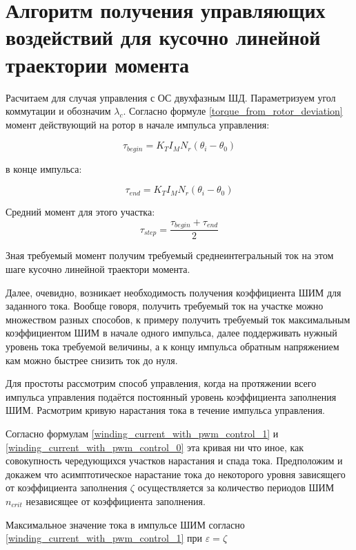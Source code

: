 \newpage
\part{ Алгоритм получения управляющих воздействий для кусочно линейной траектории момента }

Расчитаем для случая управления с ОС двухфазным ШД. Параметризуем угол коммутации и обозначим
$\lambda_c$.
Согласно формуле \ref{torque_from_rotor_deviation} момент действующий на ротор в начале импульса
управления:

\begin{equation}
    \label{moment_to_rotor_at_the_begin_of_control_pulse}    
    \tau_{begin} = K_{T} I_{M} N_{r} (\theta_{i} - \theta_{0})
\end{equation}

в конце импульса:

\begin{equation}
    \label{moment_to_rotor_at_the_end_of_control_pulse}    
    \tau_{end} = K_{T} I_{M} N_{r} (\theta_{i} - \theta_{0})
\end{equation}

Средний момент для этого участка:
$$
    \tau_{step} = \frac{ \tau_{begin} + \tau_{end} }{ 2 }
$$

Зная требуемый момент получим требуемый среднеинтегральный ток на этом шаге кусочно линейной
траектори момента. 

Далее, очевидно, возникает необходимость получения коэффициента ШИМ для заданного тока. Вообще
говоря, получить требуемый ток на участке можно множеством разных способов, к примеру получить требуемый ток
максимальным коэффициентом ШИМ в начале одного импульса, далее поддерживать нужный уровень тока
требуемой величины, а к концу импульса обратным напряжением кам можно быстрее снизить ток до нуля.

Для простоты рассмотрим способ управления, когда на протяжении всего импульса управления подаётся постоянный
уровень коэффициента заполнения ШИМ. Расмотрим кривую нарастания тока в течение импульса управления.

Согласно формулам \ref{winding_current_with_pwm_control_1} 
и \ref{winding_current_with_pwm_control_0} эта кривая ни что иное, как совокупность чередующихся
участков нарастания и спада тока. Предположим и докажем что асимптотическое нарастание тока до
некоторого уровня зависящего от коэффициента заполнения $\zeta$ осуществляется за количество периодов ШИМ
$n_{crit}$ независящее от коэффициента заполнения. 

Максимальное значение тока в импульсе ШИМ согласно \ref{winding_current_with_pwm_control_1} при
$\varepsilon=\zeta$


